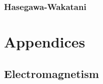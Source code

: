\documentclass[oneside,a4paper,11pt]{report}
\begin{document}
\section{Hasegawa-Wakatani}

%
%
\part{Appendices}
%
%
\appendix

\chapter{Electromagnetism}

\end{document}
